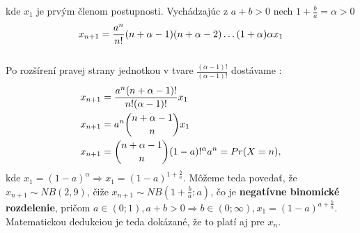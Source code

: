 \documentclass[a4paper,10pt]{article}
\theoremstyle{plain}
\theoremstyle{definition}
\begin{document}
\noindent kde $ x_{1} $ je prvým členom postupnosti. \newpage
\noindent Vychádzajúc z $ a + b > 0 $ nech $ 1 + \frac{b}{a} = \alpha > 0$\\
$$ x_{n+1} = \frac{a^{n}}{n!}\*(n+\alpha-1)\*(n+\alpha-2) \ldots (1+\alpha)\*\alpha\*x_{1}$$\\
Po rozšírení pravej strany jednotkou v tvare $ \frac{(\alpha-1)!}{(\alpha-1)!} $ dostávame : 
\begin{align*}
x_{n+1} &= \frac{a^{n}\*(n+\alpha-1)!}{n!\*(\alpha-1)!}\*x_{1} \\
x_{n+1} &= a^{n}\* \dbinom{n+\alpha-1}{n}\*x_{1} \\	%
x_{n+1} &= \dbinom{n+\alpha-1}{n}\*(1-a)!^{\alpha}\*a^{n} = Pr(X = n) ,
\end{align*}
\noindent kde $ x_{1} = (1-a)^{\alpha} \Rightarrow x_{1} = (1-a)^{1+\frac{b}{a}}$.
Môžeme teda povedať, že $ x_{n+1} \sim NB(2,9) $, čiže $ x_{n+1}\sim NB (1+\frac{b}{a}; a) $, čo je \textbf{negatívne binomické rozdelenie}, pričom
$ a \in (0;1), a+b>0 \Rightarrow b \in (0;\infty), x_{1}=(1-a)^{a+\frac{b}{a}}$. Matematickou dedukciou je teda dokázané, že to platí aj pre 
$ x_{n} $.\\
\end{document}

